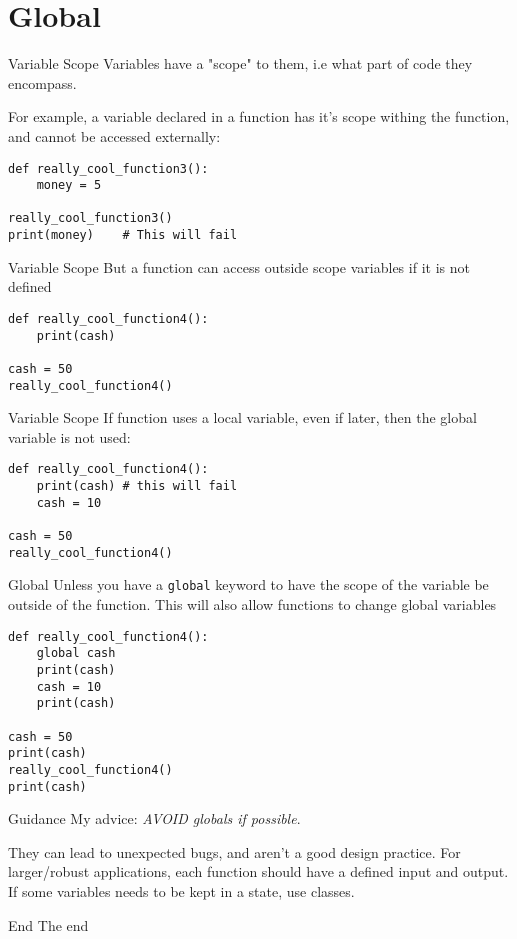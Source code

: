 \section{Global}

\begin{frame}[containsverbatim]{Variable Scope}
  Variables have a "scope" to them, i.e what part of code they encompass.

  For example, a variable declared in a function has it's scope withing the function, and cannot be accessed externally:
\begin{verbatim}
def really_cool_function3():
    money = 5

really_cool_function3()
print(money)    # This will fail
\end{verbatim}
\end{frame}

\begin{frame}[containsverbatim]{Variable Scope}
  But a function can access outside scope variables if it is not defined
\begin{verbatim}
def really_cool_function4():
    print(cash)

cash = 50
really_cool_function4()
\end{verbatim}
\end{frame}

\begin{frame}[containsverbatim]{Variable Scope}
  If function uses a local variable, even if later, then the global variable is not used:
\begin{verbatim}
def really_cool_function4():
    print(cash) # this will fail
    cash = 10

cash = 50
really_cool_function4()
\end{verbatim}
\end{frame}

\begin{frame}[containsverbatim]{Global}
  Unless you have a \verb|global| keyword to have the scope of the variable be outside of the function. This will also allow functions to change global variables
\begin{verbatim}
def really_cool_function4():
    global cash
    print(cash)
    cash = 10
    print(cash)

cash = 50
print(cash)
really_cool_function4()
print(cash)
\end{verbatim}
\end{frame}

\begin{frame}[containsverbatim]{Guidance}
  My advice: \textit{AVOID globals if possible}.

  They can lead to unexpected bugs, and aren't a good design practice. For larger/robust applications, each function should have a defined input and output. If some variables needs to be kept in a state, use classes.
\end{frame}

\begin{frame}[standout]{End}
  The end
\end{frame}


